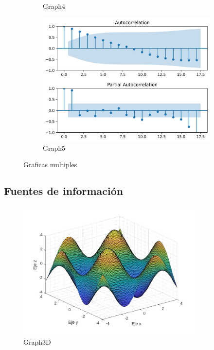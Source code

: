 \documentclass[12pt,a4paper]{article} %
\begin{document}
\begin{figure}[ht]
\begin{subfigure}[b]{0.3\textwidth}
					\caption{Graph4}
					\label{subfig: Graph4}
				\end{subfigure}
				\hfill
				\begin{subfigure}[b]{0.3\textwidth}
					\centering
					\includegraphics[width=\textwidth]{Graph5.png}
					\caption{Graph5}
					\label{subfig: Graph5}
				\end{subfigure}
				\caption{Graficas multiples}
				\label{fig: Graficas multiples}
			\end{figure}
		\subsection{Fuentes de información}
			\lipsum[1]
			\begin{figure}[ht]
				\centering
				\includegraphics[height=7cm]{Graph3D.pdf}
				\caption{Graph3D}
				\label{fig: Graph3D}
			\end{figure}
\end{document}
